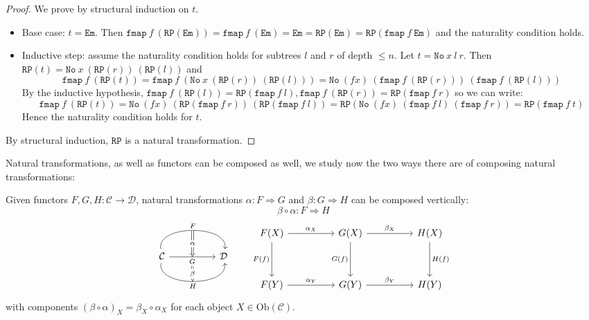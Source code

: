 \begin{proof}
We prove by structural induction on $t$.
\begin{itemize}
    \item Base case: $t = \texttt{Em}$. Then
    \(
    \texttt{fmap}\ f\ (\texttt{RP}(\texttt{Em})) = \texttt{fmap}\ f\ (\texttt{Em}) = \texttt{Em} = \texttt{RP}(\texttt{Em}) = \texttt{RP}(\texttt{fmap}\ f\ \texttt{Em})
    \)
    and the naturality condition holds.
    \item Inductive step: assume the naturality condition holds for subtrees $l$ and $r$ of depth $\le n$. Let $t = \texttt{No}\ x\ l\ r$. Then
    \(
    \texttt{RP}(t) = \texttt{No}\ x\ (\texttt{RP}(r))\ (\texttt{RP}(l))
    \)
    and
    \[
    \texttt{fmap}\ f\ (\texttt{RP}(t)) = \texttt{fmap}\ f\ (\texttt{No}\ x\ (\texttt{RP}(r))\ (\texttt{RP}(l))) = \texttt{No}\ (f x)\ (\texttt{fmap}\ f\ (\texttt{RP}(r)))\ (\texttt{fmap}\ f\ (\texttt{RP}(l)))
    \]
    By the inductive hypothesis,
    \(
    \texttt{fmap}\ f\ (\texttt{RP}(l)) = \texttt{RP}(\texttt{fmap}\ f\ l), \texttt{fmap}\ f\ (\texttt{RP}(r)) = \texttt{RP}(\texttt{fmap}\ f\ r)
    \)
    so we can write:
    \[
    \texttt{fmap}\ f\ (\texttt{RP}(t)) = \texttt{No}\ (f x)\ (\texttt{RP}(\texttt{fmap}\ f\ r))\ (\texttt{RP}(\texttt{fmap}\ f\ l)) = \texttt{RP}(\texttt{No}\ (f x)\ (\texttt{fmap}\ f\ l)\ (\texttt{fmap}\ f\ r)) = \texttt{RP}(\texttt{fmap}\ f\ t)
    \]
    Hence the naturality condition holds for $t$.
\end{itemize}

By structural induction, $\texttt{RP}$ is a natural transformation.
\end{proof}



Natural transformations, as well as functors can be composed as well, we study now the two ways there are of composing natural transformations:

\begin{proposition}
Given functors $F, G, H : \mathcal{C} \to \mathcal{D}$, natural transformations $\alpha: F \Rightarrow G$ and $\beta: G \Rightarrow H$ can be composed vertically:
\[
\beta \circ \alpha : F \Rightarrow H
\]
\[
  \begin{tikzcd}[row sep=huge, column sep=huge]
    \mathcal{C}
    \arrow[r, bend left=100, "F"{name=U}]
    \arrow[r, "G"'{name=V}]
    \arrow[r, bend right=100, "H"'{name=D}]
    & \mathcal{D}
    \arrow[Rightarrow, from=U, to=V, "\alpha" description]
    \arrow[Rightarrow, from=V, to=D, "\beta" description]
  \end{tikzcd}
  \qquad
  \begin{tikzcd}[row sep=huge, column sep=huge]
    F(X) \arrow[r, "\alpha_X"] \arrow[d, "F(f)"'] & G(X) \arrow[r, "\beta_X"] \arrow[d, "G(f)"'] & H(X) \arrow[d, "H(f)"] \\
    F(Y) \arrow[r, "\alpha_Y"] & G(Y) \arrow[r, "\beta_Y"] & H(Y)
  \end{tikzcd}
\]
with components \(
(\beta \circ \alpha)_X = \beta_X \circ \alpha_X
\) for each object $X \in \mathrm{Ob}(\mathcal{C})$.
\end{proposition}

